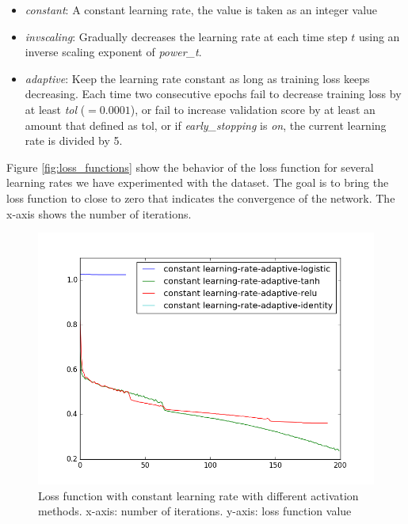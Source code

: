 \begin{itemize}
\item \emph{constant}: A constant learning rate, the value is taken as an integer value
\item \emph{invscaling}: Gradually decreases the learning rate at each time step $t$ using an inverse scaling exponent of \emph{power\_t}.
\item \emph{adaptive}: Keep the learning rate constant as long as training loss keeps decreasing. Each time two consecutive epochs fail to decrease training loss by at least \emph{tol} ($=0.0001$), or fail to increase validation score by at least an amount that defined as tol, or if \emph{early\_stopping} is \emph{on}, the current learning rate is divided by 5.
\end{itemize}

Figure \ref{fig:loss_functions} show the behavior of the loss function for several learning rates we have experimented with the dataset. The goal is to bring the loss function to close to zero that indicates the convergence of the network. The x-axis shows the number of iterations. 

\begin{figure}[!h]
\begin{center}
        \includegraphics[width=0.5\textheight]{img/constant_learning_rate.png}
        \caption{Loss function with constant learning rate with different activation methods. x-axis: number of iterations. y-axis: loss function value}  \label{fig:loss_functions_2}
\end{center}
\end{figure}


